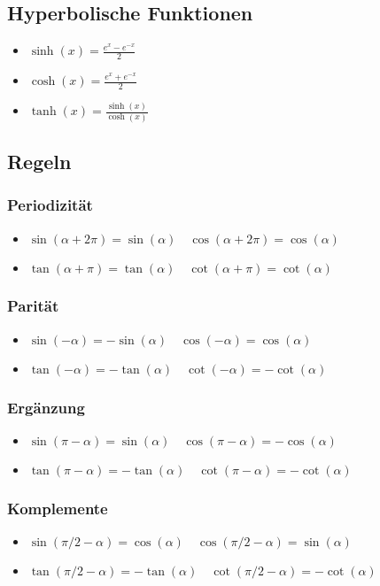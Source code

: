 \documentclass[a4paper,10pt]{article}
\begin{document}
\subsection{Hyperbolische Funktionen}
\begin{itemize}
  \item $\sinh(x) = \frac{e^x - e^{-x}}{2}$
  \item $\cosh(x) = \frac{e^x + e^{-x}}{2}$
  \item $\tanh(x) = \frac{\sinh(x)}{\cosh(x)}$
\end{itemize}

\subsection{Regeln}
\subsubsection{Periodizität}
\begin{itemize}
 \item $\sin(\alpha + 2 \pi) = \sin(\alpha) \quad \cos(\alpha + 2 \pi) = \cos(\alpha)$
 \item $\tan(\alpha + \pi) = \tan(\alpha) \quad \cot(\alpha + \pi) = \cot(\alpha)$
\end{itemize}

\subsubsection{Parität}
\begin{itemize}
 \item $\sin(-\alpha) = - \sin(\alpha) \quad \cos(-\alpha) = \cos(\alpha)$
 \item $\tan(-\alpha) = - \tan(\alpha) \quad \cot(-\alpha) = - \cot(\alpha)$
\end{itemize}

\subsubsection{Ergänzung}
\begin{itemize}
 \item $\sin(\pi - \alpha) = \sin(\alpha) \quad \cos(\pi - \alpha) = - \cos(\alpha)$
 \item $\tan(\pi - \alpha) = -\tan(\alpha) \quad \cot(\pi - \alpha) = - \cot(\alpha)$
\end{itemize}


\subsubsection{Komplemente}
\begin{itemize}
 \item $\sin(\pi/2 - \alpha) = \cos(\alpha) \quad \cos(\pi/2 - \alpha) = \sin(\alpha)$
 \item $\tan(\pi/2 - \alpha) = -\tan(\alpha) \quad \cot(\pi/2 - \alpha) = -\cot(\alpha)$
\end{itemize}
\end{document}
